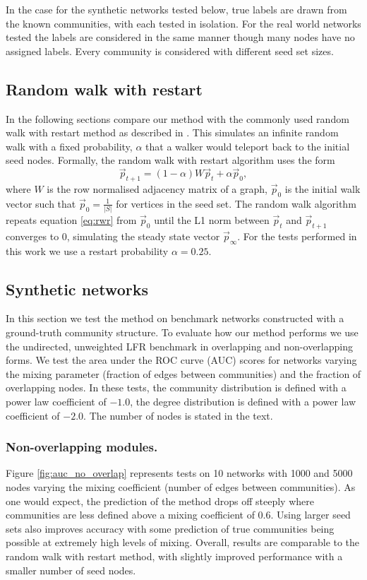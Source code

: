 \documentclass[sigconf]{acmart}
\begin{document}
In the case for the synthetic networks tested below, true labels are drawn from the known communities, with each tested in isolation.
For the real world networks tested the labels are considered in the same manner though many nodes have no assigned labels.
Every community is considered with different seed set sizes.
 
\subsection{Random walk with restart}
\label{sec:rwr}
In the following sections compare our method with the commonly used random walk with restart method as described in \cite{kohler2008walking}.
This simulates an infinite random walk with a fixed probability, $\alpha$ that a walker would teleport back to the initial seed nodes. 
Formally, the random walk with restart algorithm uses the form
\begin{equation} \label{eq:rwr}
 \vec{p}_{t+1} = (1 - \alpha) W \vec{p}_t + \alpha \vec{p}_0,
\end{equation}
where $W$ is the row normalised adjacency matrix of a graph, $\vec{p}_0$ is the initial walk vector such that $\vec{p}_0 = \frac{1}{|S|}$ for vertices in the seed set.
The random walk algorithm repeats equation \ref{eq:rwr} from $\vec{p}_0$ until the L1 norm between  $\vec{p}_t$ and  $\vec{p}_{t+1}$ converges to 0, simulating the steady state vector $\vec{p}_{\infty}$.
For the tests performed in this work we use a restart probability $\alpha = 0.25$.

\subsection{Synthetic networks}
In this section we test the method on benchmark networks constructed with a ground-truth community structure.
To evaluate how our method performs we use the undirected, unweighted LFR benchmark \cite{lancichinetti2008benchmark} in overlapping and non-overlapping forms.
We test the area under the ROC curve (AUC) scores for networks varying the mixing parameter (fraction of edges between communities) and the fraction of overlapping nodes.
In these tests, the community distribution is defined with a power law coefficient of $-1.0$, the degree distribution is defined with a power law coefficient of $-2.0$.
The number of nodes is stated in the text.

\subsubsection{Non-overlapping modules.}
Figure \ref{fig:auc_no_overlap} represents tests on 10 networks with 1000 and 5000 nodes varying the mixing coefficient (number of edges between communities).
As one would expect, the prediction of the method drops off steeply where communities are less defined above a mixing coefficient of 0.6.
Using larger seed sets also improves accuracy with some prediction of true communities being possible at extremely high levels of mixing.
Overall, results are comparable to the random walk with restart method, with slightly improved performance with a smaller number of seed nodes.
\end{document}
